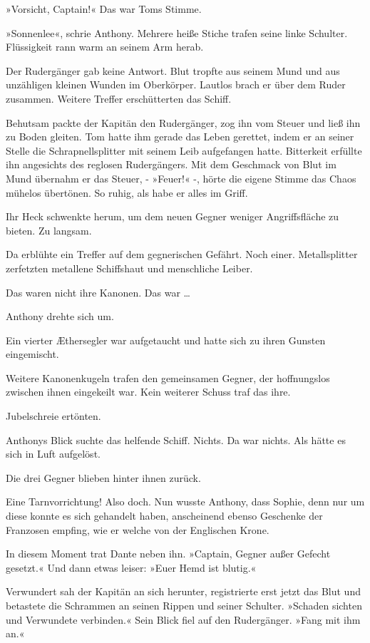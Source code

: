 »Vorsicht, Captain!« Das war Toms Stimme.

»Sonnenlee«, schrie Anthony. Mehrere heiße Stiche trafen seine
linke Schulter. Flüssigkeit rann warm an seinem Arm herab.

Der Rudergänger gab keine Antwort. Blut tropfte aus seinem Mund und
aus unzähligen kleinen Wunden im Oberkörper. Lautlos brach er über
dem Ruder zusammen. Weitere Treffer erschütterten das Schiff.

Behutsam packte der Kapitän den Rudergänger, zog ihn vom Steuer und
ließ ihn zu Boden gleiten. Tom hatte ihm gerade das Leben gerettet,
indem er an seiner Stelle die Schrapnellsplitter mit seinem Leib
aufgefangen hatte. Bitterkeit erfüllte ihn angesichts des reglosen
Rudergängers. Mit dem Geschmack von Blut im Mund übernahm er das
Steuer, - »Feuer!« -, hörte die eigene Stimme das Chaos mühelos
übertönen. So ruhig, als habe er alles im Griff.

Ihr Heck schwenkte herum, um dem neuen Gegner weniger
Angriffsfläche zu bieten. Zu langsam.

Da erblühte ein Treffer auf dem gegnerischen Gefährt. Noch einer.
Metallsplitter zerfetzten metallene Schiffshaut und menschliche
Leiber.

Das waren nicht ihre Kanonen. Das war …

Anthony drehte sich um.

Ein vierter Æthersegler war aufgetaucht und hatte sich zu ihren
Gunsten eingemischt.

Weitere Kanonenkugeln trafen den gemeinsamen Gegner, der
hoffnungslos zwischen ihnen eingekeilt war. Kein weiterer Schuss
traf das ihre.

Jubelschreie ertönten.

Anthonys Blick suchte das helfende Schiff. Nichts. Da war nichts.
Als hätte es sich in Luft aufgelöst.

Die drei Gegner blieben hinter ihnen zurück.

Eine Tarnvorrichtung! Also doch. Nun wusste Anthony, dass Sophie,
denn nur um diese konnte es sich gehandelt haben, anscheinend
ebenso Geschenke der Franzosen empfing, wie er welche von der
Englischen Krone.

In diesem Moment trat Dante neben ihn. »Captain, Gegner außer
Gefecht gesetzt.« Und dann etwas leiser: »Euer Hemd ist blutig.«

Verwundert sah der Kapitän an sich herunter, registrierte erst
jetzt das Blut und betastete die Schrammen an seinen Rippen und
seiner Schulter. »Schaden sichten und Verwundete verbinden.« Sein
Blick fiel auf den Rudergänger. »Fang mit ihm an.«

